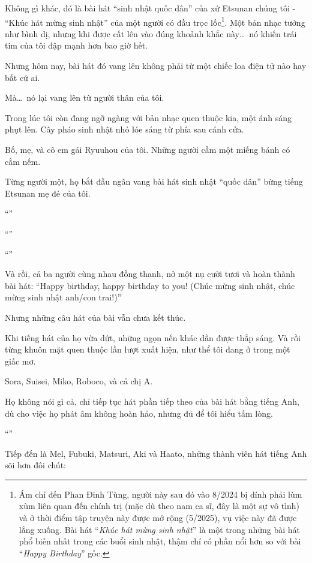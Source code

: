 \documentclass[../main.tex]{subfiles}
\begin{document}
Không gì khác, đó là bài hát ``sinh nhật quốc dân'' của xứ Etsunan chúng tôi - ``Khúc hát mừng sinh nhật'' của một người có đầu trọc lốc\footnote{Ám chỉ đến Phan Đinh Tùng, người này sau đó vào 8/2024 bị dính phải lùm xùm liên quan đến chính trị (mặc dù theo nam ca sĩ, đây là một sự vô tình) và ở thời điểm tập truyện này được mở rộng (5/2025), vụ việc này đã được lắng xuống. Bài hát ``\textit{Khúc hát mừng sinh nhật}'' là một trong những bài hát phổ biến nhất trong các buổi sinh nhật, thậm chí có phần nổi hơn so với bài ``\textit{Happy Birthday}'' gốc.}. Một bản nhạc tưởng như bình dị, nhưng khi được cất lên vào đúng khoảnh khắc này\dots\ nó khiến trái tim của tôi đập mạnh hơn bao giờ hết.

Nhưng hôm nay, bài hát đó vang lên không phải từ một chiếc loa điện tử nào hay bất cứ ai.

Mà\dots\ nó lại vang lên từ người thân của tôi.

Trong lúc tôi còn đang ngỡ ngàng với bản nhạc quen thuộc kia, một ánh sáng phụt lên. Cây pháo sinh nhật nhỏ lóe sáng từ phía sau cánh cửa.

Bố, mẹ, và cô em gái Ryuuhou của tôi. Những người cầm một miếng bánh có cắm nếm.

Từng người một, họ bắt đầu ngân vang bài hát sinh nhật ``quốc dân'' bừng tiếng Etsunan mẹ đẻ của tôi.

``''

``''

``''

Và rồi, cả ba người cùng nhau đồng thanh, nở một nụ cười tươi và hoàn thành bài hát: ``Happy birthday, happy birthday to you! (Chúc mừng sinh nhật, chúc mừng sinh nhật anh/con trai!)''

Nhưng những câu hát của bài vẫn chưa kết thúc.

Khi tiếng hát của họ vừa dứt, những ngọn nến khác dần được thắp sáng. Và rồi từng khuôn mặt quen thuộc lần lượt xuất hiện, như thể tôi đang ở trong một giấc mơ.

Sora, Suisei, Miko, Roboco, và cả chị A.

Họ không nói gì cả, chỉ tiếp tục hát phần tiếp theo của bài hát bằng tiếng Anh, dù cho việc họ phát âm không hoàn hảo, nhưng đủ để tôi hiểu tấm lòng.

``''

Tiếp đến là Mel, Fubuki, Matsuri, Aki và Haato, những thành viên hát tiếng Anh sõi hơn đôi chút:
\end{document}
